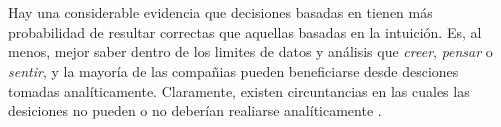 
\section{\AnalyticsCPT}


Hay una considerable evidencia que decisiones basadas en \analytics tienen más probabilidad de resultar correctas que aquellas basadas en la intuición. Es, al menos, mejor saber dentro de los limites de datos y análisis que \textit{creer}, \textit{pensar} o \textit{sentir}, y la mayoría de las compañias pueden beneficiarse desde desciones tomadas analíticamente. Claramente, existen circuntancias en las cuales las desiciones no pueden o no deberían realiarse analíticamente \cite{davenport2007competing}.








